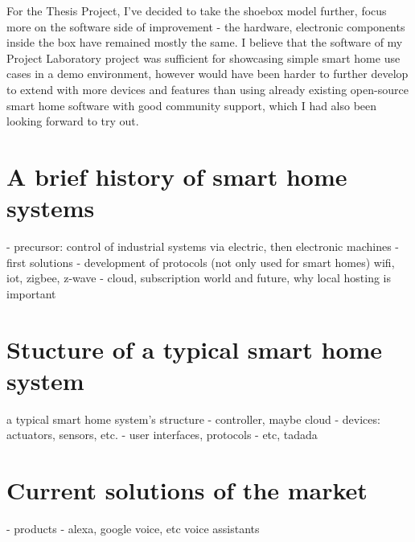 For the Thesis Project, I've decided to take the shoebox model further, focus more on the software side of improvement - the hardware, electronic components inside the box have remained mostly the same. I believe that the software of my Project Laboratory project was sufficient for showcasing simple smart home use cases in a demo environment, however would have been harder to further develop to extend with more devices and features than using already existing open-source smart home software with good community support, which I had also been looking forward to try out.

\section{A brief history of smart home systems}
- precursor: control of industrial systems via electric, then electronic machines
- first solutions
- development of protocols (not only used for smart homes) wifi, iot, zigbee, z-wave
- cloud, subscription world and future, why local hosting is important
\section{Stucture of a typical smart home system}
a typical smart home system's structure
- controller, maybe cloud
- devices: actuators, sensors, etc.
- user interfaces, protocols
- etc, tadada
\section{Current solutions of the market}
- products
- alexa, google voice, etc voice assistants
